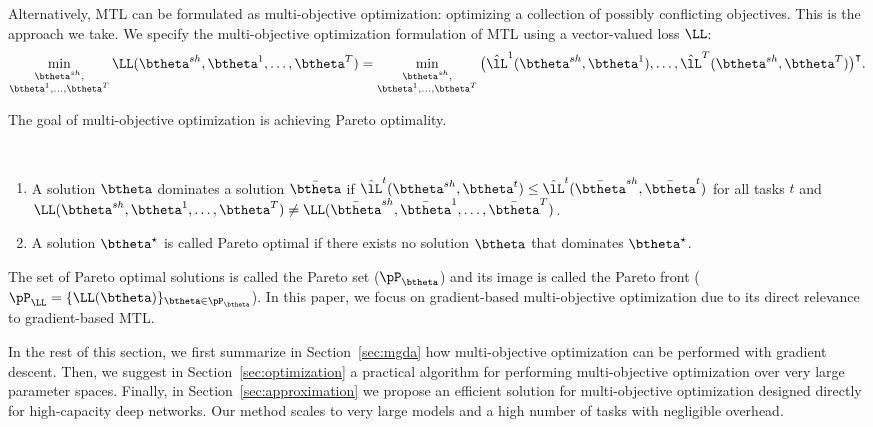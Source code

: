 Alternatively, MTL can be formulated as multi-objective optimization: optimizing a collection of possibly conflicting objectives. This is the approach we take. We specify the multi-objective optimization formulation of MTL using a vector-valued loss $\LL$:
\begin{equation}
\min_{\substack{\btheta^{sh},\\ \btheta^1,\ldots,\btheta^T}} \LL(\btheta^{sh}, \btheta^1,\ldots,\btheta^T) =
\min_{\substack{\btheta^{sh},\\ \btheta^1,\ldots,\btheta^T}} \big( \hat{\lL}^1(\btheta^{sh},\btheta^1), \ldots,  \hat{\lL}^T(\btheta^{sh},\btheta^T) \big)^\intercal .
\end{equation}

The goal of multi-objective optimization is achieving Pareto optimality.


\begin{definition} {\ }%
\begin{enumerate}[ topsep=0pt, label=\emph{(\alph*)},align=left,leftmargin=*]
\item A solution $\btheta$ dominates a solution $\bar{\btheta}$ if \mbox{$\hat{\lL}^t(\btheta^{sh},\btheta^t)  \leq \hat{\lL}^t(\bar{\btheta}^{sh},\bar{\btheta}^t)$} for all tasks $t$ and \mbox{$\LL(\btheta^{sh}, \btheta^1,\ldots,\btheta^T) \neq\LL(\bar{\btheta}^{sh}, \bar{\btheta}^1,\ldots,\bar{\btheta}^T) $}.
\item A solution $\btheta^\star$ is called Pareto optimal if there exists no solution $\btheta$ that dominates $\btheta^\star$.
\end{enumerate}
\end{definition}

The set of Pareto optimal solutions is called the Pareto set ($\pP_{\btheta}$) and its image is called the Pareto front ($\pP_{\LL} = \{ \LL(\btheta)\}_{\btheta \in \pP_{\btheta}}$). In this paper, we focus on gradient-based multi-objective optimization due to its direct relevance to gradient-based MTL.

In the rest of this section, we first summarize in Section~\ref{sec:mgda} how multi-objective optimization can be performed with gradient descent. Then, we suggest in Section~\ref{sec:optimization} a practical algorithm for performing multi-objective optimization over very large parameter spaces. Finally, in Section~\ref{sec:approximation} we propose an efficient solution for multi-objective optimization designed directly for high-capacity deep networks. Our method scales to very large models and a high number of tasks with negligible overhead.



